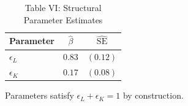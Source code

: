 \begin{table}[htbp]
\centering
\caption{Table VI: Structural Parameter Estimates}
\begin{threeparttable}
\begin{tabular}{lcc}
\toprule
Parameter & $\hat{\beta}$ & $\widehat{\mathrm{SE}}$ \\
\midrule
$\epsilon_L$ & $0.83$ & $(0.12)$ \\
$\epsilon_K$ & $0.17$ & $(0.08)$ \\
\bottomrule
\end{tabular}
\begin{tablenotes}[flushleft]
\item Parameters satisfy $\epsilon_L + \epsilon_K = 1$ by construction.
\end{tablenotes}
\end{threeparttable}
\end{table}
